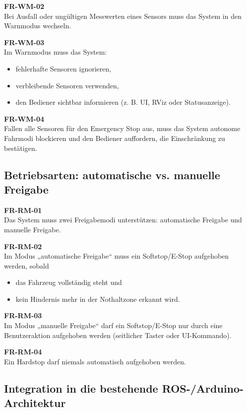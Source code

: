 \textbf{FR-WM-02}\\
Bei Ausfall oder ungültigen Messwerten eines Sensors muss das System in den Warnmodus wechseln.

\textbf{FR-WM-03}\\
Im Warnmodus muss das System:
\begin{itemize}
    \item fehlerhafte Sensoren ignorieren,
    \item verbleibende Sensoren verwenden,
    \item den Bediener sichtbar informieren (z. B. UI, RViz oder Statusanzeige).
\end{itemize}

\textbf{FR-WM-04}\\
Fallen alle Sensoren für den Emergency Stop aus, muss das System autonome Fahrmodi blockieren
und den Bediener auffordern, die Einschränkung zu bestätigen.


\subsection{Betriebsarten: automatische vs. manuelle Freigabe}
\label{sec:release_modes}

\textbf{FR-RM-01}\\
Das System muss zwei Freigabemodi unterstützen: automatische Freigabe und manuelle Freigabe.

\textbf{FR-RM-02}\\
Im Modus „automatische Freigabe“ muss ein Softstop/E-Stop aufgehoben werden, sobald
\begin{itemize}
    \item das Fahrzeug vollständig steht und
    \item kein Hindernis mehr in der Nothaltzone erkannt wird.
\end{itemize}

\textbf{FR-RM-03}\\
Im Modus „manuelle Freigabe“ darf ein Softstop/E-Stop nur durch eine Benutzeraktion aufgehoben werden (seitlicher Taster oder UI-Kommando).

\textbf{FR-RM-04}\\
Ein \ac{Hardstop} darf niemals automatisch aufgehoben werden.


\subsection{Integration in die bestehende ROS-/Arduino-Architektur}
\label{sec:integration_architektur}

